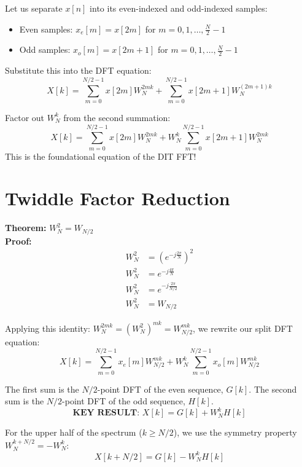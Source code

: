 \documentclass[11pt,a4paper]{article}
\begin{document}
Let us separate $x[n]$ into its even-indexed and odd-indexed samples:
\begin{itemize}
    \item Even samples: $x_e[m] = x[2m]$ for $m = 0, 1, \dots, \frac{N}{2}-1$
    \item Odd samples: $x_o[m] = x[2m+1]$ for $m = 0, 1, \dots, \frac{N}{2}-1$
\end{itemize}

Substitute this into the DFT equation:
\begin{equation}
X[k] = \sum_{m=0}^{N/2-1} x[2m] W_N^{2mk} + \sum_{m=0}^{N/2-1} x[2m+1] W_N^{(2m+1)k}
\end{equation}

Factor out $W_N^k$ from the second summation:
\begin{equation}
X[k] = \sum_{m=0}^{N/2-1} x[2m] W_N^{2mk} + W_N^k \sum_{m=0}^{N/2-1} x[2m+1] W_N^{2mk}
\end{equation}
This is the foundational equation of the DIT FFT!

\section{Twiddle Factor Reduction}
\textbf{Theorem:} $W_N^2 = W_{N/2}$ \\
\textbf{Proof:}
\begin{align*}
W_N^2 &= \left( e^{-j \frac{2\pi}{N}} \right)^2 \\
W_N^2 &= e^{-j \frac{4\pi}{N}} \\
W_N^2 &= e^{-j \frac{2\pi}{N/2}} \\
W_N^2 &= W_{N/2}
\end{align*}

Applying this identity: $W_N^{2mk} = (W_N^2)^{mk} = W_{N/2}^{mk}$, we rewrite our split DFT equation:
\begin{equation}
X[k] = \sum_{m=0}^{N/2-1} x_e[m] W_{N/2}^{mk} + W_N^k \sum_{m=0}^{N/2-1} x_o[m] W_{N/2}^{mk}
\end{equation}

The first sum is the $N/2$-point DFT of the even sequence, $G[k]$. The second sum is the $N/2$-point DFT of the odd sequence, $H[k]$.
\begin{equation}
\textbf{KEY RESULT: } X[k] = G[k] + W_N^k H[k]
\end{equation}

For the upper half of the spectrum ($k \ge N/2$), we use the symmetry property $W_N^{k+N/2} = -W_N^k$:
\begin{equation}
X[k+N/2] = G[k] - W_N^k H[k]
\end{equation}
\end{document}
